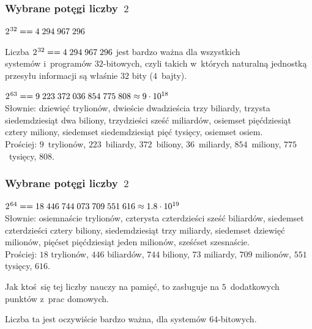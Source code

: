 \documentclass[10pt,t]{beamer}
\begin{document}
\begin{frame}
  \frametitle{Wybrane potęgi liczby~$2$}


  $2^{ \hspace{0.07em} 32 } == 4 \; 294 \; 967 \; 296$

  Liczba $2^{ \hspace{0.07em} 32 } == 4 \; 294 \; 967 \; 296$ jest bardzo ważna
  dla wszystkich \\
  systemów i~programów $32$-bitowych, czyli takich w~których
  naturalną jednostką przesyłu informacji są właśnie $32$ bity ($4$~bajty).

  $2^{ \hspace{0.07em} 63 } == 9 \; 223 \; 372 \; 036 \; 854 \; 775 \; 808 \approx
  9 \cdot 10^{ 18 }$ \\
  Słownie: dziewięć trylionów, dwieście dwadzieścia trzy biliardy, trzysta
  siedemdziesiąt dwa biliony, trzydzieści sześć miliardów, osiemset
  pięćdziesiąt cztery miliony, siedemset siedemdziesiąt pięć tysięcy,
  osiemset osiem. \\
  Prościej: $9$~trylionów, $223$~biliardy, $372$~biliony,
  $36$~miliardy, $854$~miliony, $775$~tysięcy, $808$.

\end{frame}





\begin{frame}
  \frametitle{Wybrane potęgi liczby~$2$}


  $2^{ \hspace{0.07em} 64 } == 18 \; 446 \; 744 \; 073 \; 709 \; 551 \; 616 \approx
  1.8 \cdot 10^{ 19 }$ \\
  Słownie: osiemnaście trylionów, czterysta czterdzieści sześć biliardów,
  siedemset czterdzieści cztery biliony, siedemdziesiąt trzy miliardy,
  siedemset dziewięć milionów, pięćset pięćdziesiąt jeden milionów,
  sześćset szesnaście. \\
  Prościej: $18$ trylionów, $446$ biliardów, $744$ biliony, $73$ miliardy,
  $709$ milionów, $551$ tysięcy, $616$.

  Jak ktoś~się tej liczby nauczy na pamięć, to zasługuje na $5$~dodatkowych
  punktów z~prac domowych.

  Liczba ta jest oczywiście bardzo ważna, dla systemów $64$-bitowych.

\end{frame}
\end{document}
